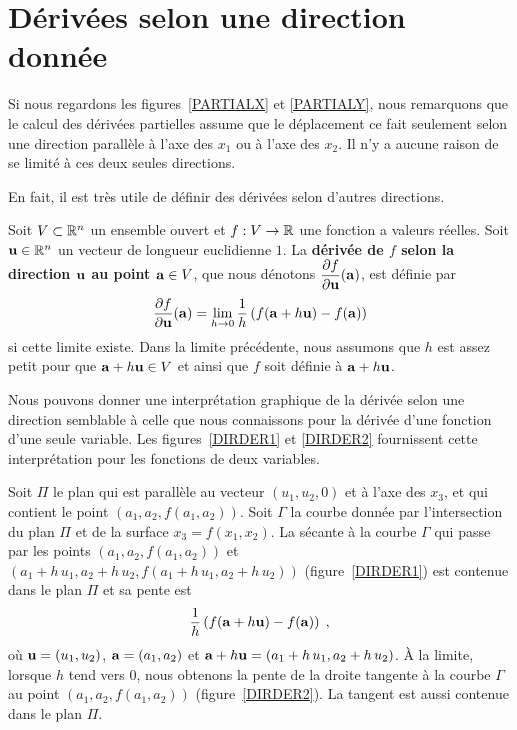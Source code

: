 {\section{Dérivées selon une direction donnée \eng}

Si nous regardons les figures~\ref{PARTIALX} et \ref{PARTIALY}, nous
remarquons que le calcul des dérivées partielles assume que le
déplacement ce fait seulement selon une direction parallèle à l'axe
des $x_1$ ou à l'axe des $x_2$.  Il n'y a aucune raison de se limité à ces
deux seules directions.

En fait, il est très utile de définir des dérivées selon d'autres
directions.

\begin{defn} 
Soit $V\subset \mathbb{R}^n$ un ensemble ouvert et $f:V\rightarrow \mathbb{R}$ une
fonction a valeurs réelles.  Soit 
$\mathbf{u} \in \mathbb{R}^n$ un vecteur de longueur euclidienne $1$.  La
{\bfseries dérivée de $f$ selon la direction $\mathbf{u}$ au point
$\mathbf{a} \in V$}, que nous dénotons
$\displaystyle \frac{\partial f}{\partial \mathbf{u}}(\mathbf{a})$, est définie par
\[
\frac{\partial f}{\partial \mathbf{u}}(\mathbf{a}) =
\lim_{h\rightarrow 0} \frac{1}{h}\left(f(\mathbf{a}+h\mathbf{u})-f(\mathbf{a})\right)
\]
si cette limite existe.  Dans la limite précédente, nous assumons que
$h$ est assez petit pour que $\mathbf{a}+h\mathbf{u} \in V$ et ainsi que $f$
soit définie à $\mathbf{a}+h\mathbf{u}$.
\end{defn}

Nous pouvons donner une interprétation graphique de la dérivée selon une
direction semblable à celle que nous connaissons pour la dérivée d'une
fonction d'une seule variable.  Les figures~\ref{DIRDER1} et
\ref{DIRDER2} fournissent cette interprétation pour les fonctions de
deux variables.

Soit $\Pi$ le plan qui est parallèle au vecteur $(u_1,u_2,0)$ et à
l'axe des $x_3$, et qui contient le point $(a_1,a_2,f(a_1,a_2))$.
Soit $\Gamma$ la courbe donnée par l'intersection du plan $\Pi$ et de
la surface $x_3 = f(x_1,x_2)$.  La sécante à la courbe $\Gamma$ qui
passe par les points $(a_1,a_2,f(a_1,a_2))$
et $(a_1+h\,u_1,a_2+h\,u_2,f(a_1+h\,u_1,a_2+h\,u_2))$ (figure~\ref{DIRDER1})
est contenue dans le plan $\Pi$ et sa pente est
\[
\frac{1}{h}\left(f(\mathbf{a}+h\mathbf{u})-f(\mathbf{a})\right) \; ,
\]
où $\mathbf{u}=(u_1,u_2)$, $\mathbf{a}=(a_1,a_2)$ et
$\mathbf{a}+h\mathbf{u} = (a_1+h\,u_1,a_2+h\,u_2)$.
À la limite, lorsque $h$ tend vers $0$, nous obtenons la pente de la
droite tangente à la courbe $\Gamma$ au point $(a_1,a_2,f(a_1,a_2))$
(figure~\ref{DIRDER2}).  La tangent est aussi contenue dans le plan $\Pi$.

}
